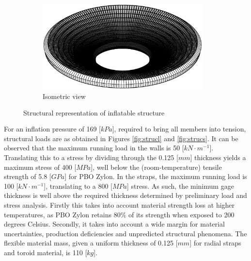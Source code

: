 \begin{figure}[h]
\begin{subfigure}[c]{0.5\textwidth}
		\includegraphics[width=0.96\textwidth]{./Figure/Structure/struc_rep.eps}
		\caption{Isometric view}
		\label{fig:iso}
	\end{subfigure}
\caption{Structural representation of inflatable structure}
\label{fig:strucreps}
\end{figure}

For an inflation pressure of 169 [$kPa$], required to bring all members into tension, structural loads are as obtained in Figures \ref{fig:strucl} and \ref{fig:strucs}. It can be observed that the maximum running load in the walls is 50 [$kN \cdot m^{-1}$]. Translating this to a stress by dividing through the 0.125 [$mm$] thickness yields a maximum stress of 400 [$MPa$], well below the (room-temperature) tensile strength of 5.8 [$GPa$] for PBO Zylon. In the straps, the maximum running load is 100 [$kN \cdot m^{-1}$], translating to a 800 [$MPa$] stress. As such, the minimum gage thickness is well above the required thickness determined by preliminary load and stress analysis. Firstly this takes into account material strength loss at higher temperatures, as PBO Zylon retains $80\%$ of its strength when exposed to 200 degrees Celsius. Secondly, it takes into account a wide margin for material uncertainties, production deficiencies and unpredicted structural phenomena. The flexible material mass, given a uniform thickness of 0.125 [$mm$] for radial straps and toroid material, is 110 [$kg$].

